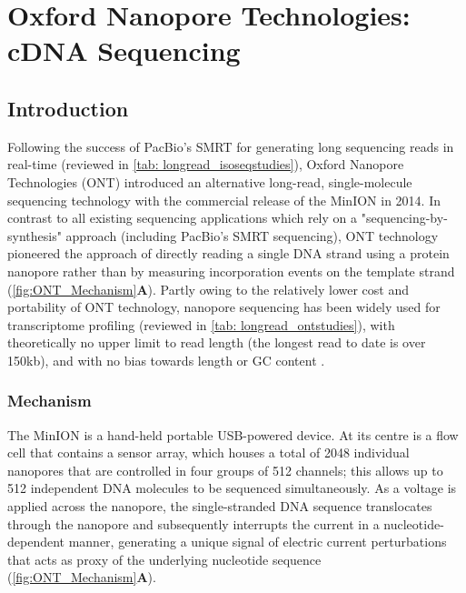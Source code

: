 \clearpage

\section{Oxford Nanopore Technologies: cDNA Sequencing}
\label{sec:ONT_cDNA_Sequencing}

\subsection{Introduction}
Following the success of PacBio's SMRT for generating long sequencing reads in real-time (reviewed in \cref{tab: longread_isoseqstudies}), Oxford Nanopore Technologies (ONT) introduced an alternative long-read, single-molecule sequencing technology with the commercial release of the MinION in 2014. In contrast to all existing sequencing applications which rely on a "sequencing-by-synthesis" approach (including PacBio's SMRT sequencing), ONT technology pioneered the approach of directly reading a single DNA strand using a protein nanopore rather than by measuring incorporation events on the template strand\cite{Jain2015} (\cref{fig:ONT_Mechanism}\textbf{A}). Partly owing to the relatively lower cost and portability of ONT technology, nanopore sequencing has been widely used for transcriptome profiling (reviewed in \cref{tab: longread_ontstudies}), 
with theoretically no upper limit to read length \cite{Loman2015} (the longest read to date is over 150kb), and with no bias towards length or GC content \cite{Oikonomopoulos2016, Weirather2017}.


\subsubsection{Mechanism}
The MinION is a hand-held portable USB-powered device. At its centre is a flow cell that contains a sensor array, which houses a total of 2048 individual nanopores that are controlled in four groups of 512 channels; this allows up to 512 independent DNA molecules to be sequenced simultaneously\cite{Jain2015}. As a voltage is applied across the nanopore, the single-stranded DNA sequence translocates through the nanopore and subsequently interrupts the current in a nucleotide-dependent manner, generating a unique signal of electric current perturbations that acts as proxy of the underlying nucleotide sequence (\cref{fig:ONT_Mechanism}\textbf{A}). 

